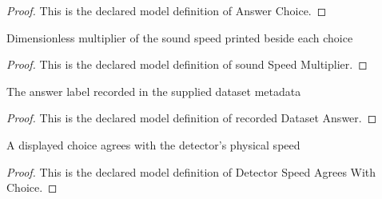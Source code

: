\begin{proof}
  This is the declared model definition of Answer Choice.
\end{proof}
\begin{definition}
  \label{def:physics:phyx-mini-0320:phyxminiproblems-problemphyxmini0320-answerchoice-soundspeedmultiplier}
  Dimensionless multiplier of the sound speed printed beside each choice
\end{definition}
\begin{proof}
  This is the declared model definition of sound Speed Multiplier.
\end{proof}
\begin{definition}
  \label{def:physics:phyx-mini-0320:phyxminiproblems-problemphyxmini0320-recordeddatasetanswer}
  The answer label recorded in the supplied dataset metadata
\end{definition}
\begin{proof}
  This is the declared model definition of recorded Dataset Answer.
\end{proof}
\begin{definition}
  \label{def:physics:phyx-mini-0320:phyxminiproblems-problemphyxmini0320-detectorspeedagreeswithchoice}
  A displayed choice agrees with the detector's physical speed
\end{definition}
\begin{proof}
  This is the declared model definition of Detector Speed Agrees With Choice.
\end{proof}
